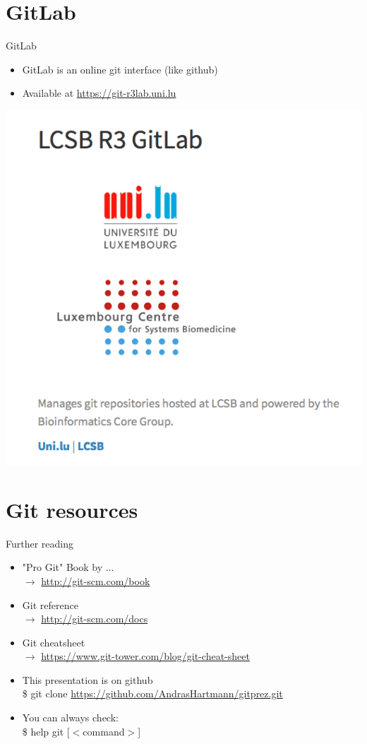 \documentclass[10pt,xcolor=dvipsnames]{beamer}
\begin{document}
\section{GitLab}
\begin{frame}{GitLab}
\begin{itemize}
\item GitLab is an online git interface (like github)\\
\item Available at \url{https://git-r3lab.uni.lu}\\[0.2in]
\end{itemize}
\centering
\includegraphics[height=0.70\paperheight]{gitlab.png} 
\end{frame}

\section{Git resources}
\begin{frame}{Further reading}
\begin{itemize}
  \setlength\itemsep{0.2in}
\item "Pro Git" Book by ... \\$\rightarrow$  \url{http://git-scm.com/book}
\item Git reference  \\ $\rightarrow$  \url{http://git-scm.com/docs}
\item Git cheatsheet  \\ $\rightarrow$ \url{https://www.git-tower.com/blog/git-cheat-sheet}
\item This presentation is on github\\
\$ git clone \url{https://github.com/AndrasHartmann/gitprez.git}
\item You can always check:\\
 \$ help git [$<$command$>$]
\end{itemize}
\end{frame}
\end{document}
